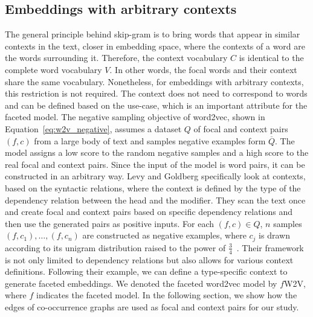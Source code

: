 \subsection{Embeddings with arbitrary contexts}\label{sec:arbitarty_context}
The general principle behind skip-gram is to bring words that appear in similar contexts in the text, closer in embedding space, where the contexts of a word are the words surrounding it. Therefore, the context vocabulary $C$ is identical to the complete word vocabulary $V$. In other words, the focal words and their context share the same vocabulary. Nonetheless, for embeddings with arbitrary contexts, this restriction is not required. The context does not need to correspond to words and can be defined based on the use-case, which is an important attribute for the faceted model. The negative sampling objective of word2vec, shown in Equation~\ref{eq:w2v_negative}, assumes a dataset $Q$ of focal and context pairs $(f,c)$ from a large body of text and samples negative examples form $\overline{Q}$. The model assigns a low score to the random negative samples and a high score to the real focal and context pairs. Since the input of the model is word pairs, it can be constructed in an arbitrary way. Levy and Goldberg specifically look at contexts, based on the syntactic relations, where the context is defined by the type of the dependency relation between the head and the modifier. They scan the text once and create focal and context pairs based on specific dependency relations and then use the generated pairs as positive inputs. For each $(f,c) \in Q$, $n$ samples $(f,c_1),\dots,(f,c_n)$ are constructed as negative examples, where $c_j$ is drawn according to its unigram distribution raised to the power of $\frac{3}{4}$~. Their framework is not only limited to dependency relations but also allows for various context definitions\cite{SCHOL:website/Levy2014}. Following their example, we can define a type-specific context to generate faceted embeddings. We denoted the faceted word2vec model by $f$W2V, where $f$ indicates the faceted model. In the following section, we show how the edges of co-occurrence graphs are used as focal and context pairs for our study.
